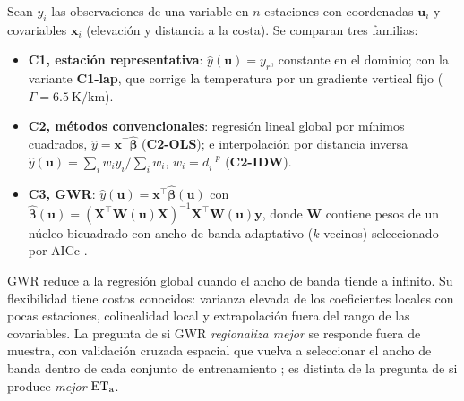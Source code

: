 Sean $y_i$ las observaciones de una variable en $n$ estaciones con
coordenadas $\mathbf{u}_i$ y covariables $\mathbf{x}_i$ (elevación y distancia
a la costa). Se comparan tres familias:
\begin{itemize}
  \item \textbf{C1, estación representativa}: $\hat y(\mathbf{u}) = y_r$,
  constante en el dominio; con la variante \textbf{C1-lap}, que corrige la
  temperatura por un gradiente vertical fijo
  ($\Gamma = \SI{6,5}{\kelvin\per\kilo\metre}$).
  \item \textbf{C2, métodos convencionales}: regresión lineal global por
  mínimos cuadrados, $\hat y = \mathbf{x}^\top\hat{\boldsymbol\beta}$
  (\textbf{C2-OLS}); e interpolación por distancia inversa
  $\hat y(\mathbf{u}) = \sum_i w_i y_i/\sum_i w_i$, $w_i = d_i^{-p}$
  (\textbf{C2-IDW}).
  \item \textbf{C3, GWR}: $\hat y(\mathbf{u}) =
  \mathbf{x}^\top\hat{\boldsymbol\beta}(\mathbf{u})$ con
  $\hat{\boldsymbol\beta}(\mathbf{u}) = (\mathbf{X}^\top\mathbf{W}(\mathbf{u})
  \mathbf{X})^{-1}\mathbf{X}^\top\mathbf{W}(\mathbf{u})\mathbf{y}$, donde
  $\mathbf{W}$ contiene pesos de un núcleo bicuadrado con ancho de banda
  adaptativo ($k$ vecinos) seleccionado por AICc
  \parencite{brunsdon1996gwr,fotheringham2002gwr,gollini2015gwmodel}.
\end{itemize}
GWR reduce a la regresión global cuando el ancho de banda tiende a infinito.
Su flexibilidad tiene costos conocidos: varianza elevada de los coeficientes
locales con pocas estaciones, colinealidad local
\parencite{wheeler2005multicollinearity} y extrapolación fuera del rango de
las covariables. La pregunta de si GWR \emph{regionaliza mejor} se responde
fuera de muestra, con validación cruzada espacial que vuelva a seleccionar
el ancho de banda dentro de cada conjunto de entrenamiento
\parencite{roberts2017cv,valavi2019blockcv}; es distinta de la pregunta de
si produce \emph{mejor} $\mathrm{ET_a}$.
